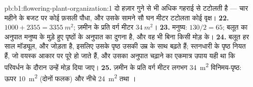 \begin{solution}{pb:b1:flowering-plant-organization:1}
दो हज़ार गुने से भी अधिक गहराई से टटोलती है ---
चार महीने के बजट पर कोई फ़सली पौधा, और उसके सामने सौ घन मीटर टटोलता कोई
वृक्ष।
\textbf{22.} $1000 + 2355 = \qty{3355}{m^2}$; ज़मीन के प्रति वर्ग मीटर
$\qty{34}{m^2}$।
\textbf{23.} मनुष्य: $130/2 = 65$; बलूत का अनुपात मनुष्य के मुड़े हुए
पृष्ठों के अनुपात का दुगना है, और वह भी बिना किसी मोड़ के।
\textbf{24.} बलूत हर साल मॉड्यूल,  और  जोड़ता है, इसलिए उसके
पृष्ठ उसकी उम्र के साथ बढ़ते हैं; स्तनधारी के पृष्ठ नियत  हैं, जो वयस्क
आकार पर पूरे हो जाते हैं, और उसका अनुपात चढ़ाने का एकमात्र उपाय यही था कि
परिवर्धन के दौरान उन्हें मोड़ दिया जाए।
\textbf{25.} ज़मीन के प्रति वर्ग मीटर लगभग \qty{34}{m^2} विनिमय-पृष्ठ:
ऊपर \qty{10}{m^2}  (दोनों फलक) और नीचे \qty{24}{m^2}
 तथा ।
\end{solution}
